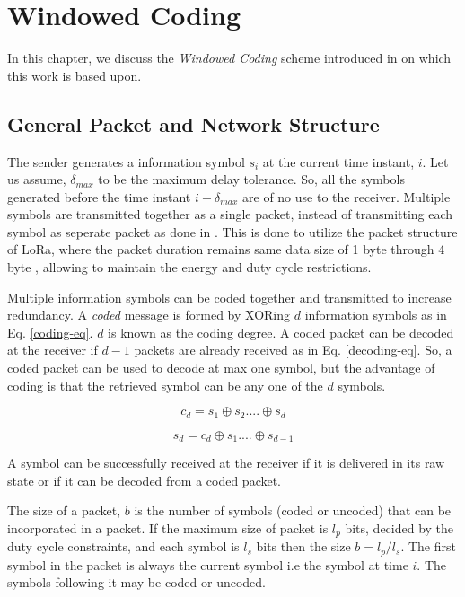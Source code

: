 \chapter{Windowed Coding}
\graphicspath{{Chapter_2/Vector/}{Chapter_2/}}

In this chapter, we discuss the \textit{Windowed Coding} scheme introduced in \cite{borkotokyicc} on which this work is based upon.

\section{General Packet and Network Structure}
The sender generates a information symbol $s_i$ at the current time instant, $i$. Let us assume, $\delta_{max}$ to be the maximum delay tolerance. So, all the symbols generated before the time instant $i - \delta_{max}$ are of no use to the receiver. Multiple symbols are transmitted together as a single packet, instead of transmitting each symbol as seperate packet as done in \cite{DRINEA2013100, Fong}. This is done to utilize the packet structure of LoRa, where the packet duration remains same data size of 1 byte through 4 byte \cite{lora}, allowing to maintain the energy and duty cycle restrictions.

Multiple information symbols can be coded together and transmitted to increase redundancy. A \textit{coded} message is formed by XORing $d$ information symbols as in Eq. \ref{coding-eq}. $d$ is known as the coding degree. A coded packet can be decoded at the receiver if $d-1$ packets are already received as in Eq. \ref{decoding-eq}. So, a coded packet can be used to decode at max one symbol, but the advantage of coding is that the retrieved symbol can be any one of the $d$ symbols. 

\begin{equation}
c_d = s_1 \oplus s_2 .... \oplus s_d
\label{coding-eq}
\end{equation}

\begin{equation}
	s_d = c_d \oplus s_1 .... \oplus s_{d-1}
	\label{decoding-eq}
\end{equation}

A symbol can be successfully received at the receiver if it is delivered in its raw state or if it can be decoded from a coded packet.

The size of a packet, $b$ is the number of symbols (coded or uncoded) that can be incorporated in a packet. If the maximum size of packet is $l_p$ bits, decided by the duty cycle constraints, and each symbol is $l_s$ bits then the size $b = l_p/l_s$. The first symbol in the packet is always the current symbol i.e the symbol at time $i$. The symbols following it may be coded or uncoded.
\\

